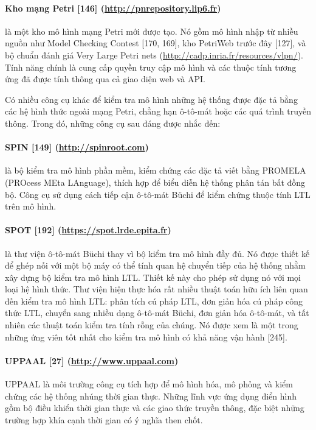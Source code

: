 \paragraph{Kho mạng Petri [146] (\url{http://pnrepository.lip6.fr})}
là một kho mô hình mạng Petri mới được tạo. Nó gồm mô hình nhập từ nhiều nguồn như Model Checking Contest [170, 169], kho PetriWeb trước đây [127], và bộ chuẩn đánh giá Very Large Petri nets (\url{http://cadp.inria.fr/resources/vlpn/}). Tính năng chính là cung cấp quyền truy cập mô hình và các thuộc tính tương ứng đã được tính thông qua cả giao diện web và API.

Có nhiều công cụ khác để kiểm tra mô hình những hệ thống được đặc tả bằng các hệ hình thức ngoài mạng Petri, chẳng hạn ô-tô-mát hoặc các quá trình truyền thông. Trong đó, những công cụ sau đáng được nhắc đến:

\paragraph{SPIN [149] (\url{http://spinroot.com})}
là bộ kiểm tra mô hình phần mềm, kiểm chứng các đặc tả viết bằng PROMELA (PROcess MEta LAnguage), thích hợp để biểu diễn hệ thống phân tán bất đồng bộ. Công cụ sử dụng cách tiếp cận ô-tô-mát Büchi để kiểm chứng thuộc tính LTL trên mô hình.

\paragraph{SPOT [192] (\url{https://spot.lrde.epita.fr})}
là thư viện ô-tô-mát Büchi thay vì bộ kiểm tra mô hình đầy đủ. Nó được thiết kế để ghép nối với một bộ máy có thể tính quan hệ chuyển tiếp của hệ thống nhằm xây dựng bộ kiểm tra mô hình LTL. Thiết kế này cho phép sử dụng nó với mọi loại hệ hình thức. Thư viện hiện thực hóa rất nhiều thuật toán hữu ích liên quan đến kiểm tra mô hình LTL: phân tích cú pháp LTL, đơn giản hóa cú pháp công thức LTL, chuyển sang nhiều dạng ô-tô-mát Büchi, đơn giản hóa ô-tô-mát, và tất nhiên các thuật toán kiểm tra tính rỗng của chúng. Nó được xem là một trong những ứng viên tốt nhất cho kiểm tra mô hình có khả năng vận hành [245].

\paragraph{UPPAAL [27] (\url{http://www.uppaal.com})}
UPPAAL là môi trường công cụ tích hợp để mô hình hóa, mô phỏng và kiểm chứng các hệ thống nhúng thời gian thực. Những lĩnh vực ứng dụng điển hình gồm bộ điều khiển thời gian thực và các giao thức truyền thông, đặc biệt những trường hợp khía cạnh thời gian có ý nghĩa then chốt.

